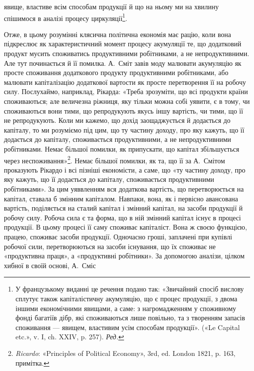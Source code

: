 \parcont{}  %
явище, властиве всім способам продукції й що на ньому ми на
хвилину спішимося в аналізі процесу циркуляції\footnote*{
У французькому виданні це речення подано так: «Звичайний спосіб
вислову сплутує також капіталістичну акумуляцію, що є процес
продукції, з двома іншими економічними явищами, а саме: з нагромадженням
у споживному фонді багатіїв дібр, які споживаються лише
повільно, та з творенням запасів споживання — явищем, властивим усім
способам продукції». («Le Capital etc.», v. I, ch. XXIV, p. 257). \emph{Ред.}
}.

Отже, в цьому розумінні клясична політична економія має
рацію, коли вона підкреслює як характеристичний момент процесу
акумуляції те, що додатковий продукт мусить споживатись
продуктивними робітниками, а не непродуктивними. Але тут починається
й її помилка. А.~Сміт завів моду малювати акумуляцію як
просте споживання додаткового продукту продуктивними робітниками,
або малювати капіталізацію додаткової вартости як просте
перетворення її на робочу силу. Послухаймо, наприклад, Рікарда:
«Треба зрозуміти, що всі продукти країни споживаються; але величезна
ріжниця, яку тільки можна собі уявити, є в тому, чи споживаються
вони тими, що репродукують якусь іншу вартість, чи тими,
що її не репродукують. Коли ми кажемо, що дохід заощаджується
й додається до капіталу, то ми розуміємо під цим, що ту частину
доходу, про яку кажуть, що її додається до капіталу, споживається
продуктивними, а не непродуктивними робітниками. Немає
більшої помилки, як припускати, що капітал збільшується через
неспоживання»\footnote{
\emph{Ricardo}: «Principles of Political Economy», 3rd, ed. London
1821, p. 163, примітка.
}. Немає більшої помилки, як та, що її за
А.~Смітом проказують Рікардо і всі пізніші економісти, а саме,
що «ту частину доходу, про яку кажуть, що її додається до капіталу,
споживається продуктивними робітниками». За цим уяввленням
вся додаткова вартість, що перетворюється на капітал,
ставала б змінним капіталом. Навпаки, вона, як і первісно авансована
вартість, поділяється на сталий капітал і змінний капітал,
на засоби продукції й робочу силу. Робоча сила є та форма, що
в ній змінний капітал існує в процесі продукції. В цьому процесі
її саму споживає капіталіст. Вона ж своєю функцією, працею,
споживає засоби продукції. Одночасно гроші, заплачені при
купівлі робочої сили, перетворюються на засоби існування, що
їх споживає не «продуктивна праця», а «продуктивні робітники».
За допомогою аналізи, цілком хибної в своїй основі, А.~Сміс
